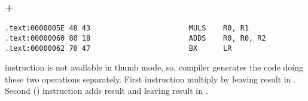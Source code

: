 \subsubsection{\OptimizingKeil + \ThumbMode}

\begin{lstlisting}
.text:0000005E 48 43                       MULS    R0, R1
.text:00000060 80 18                       ADDS    R0, R0, R2
.text:00000062 70 47                       BX      LR
\end{lstlisting}

{ instruction is not available in thumb mode, so, compiler generates the code doing these two operations
separately.}
{First  instruction multiply \Rzero by \Rone leaving result in \Rone.}
{Second () instruction adds result and \Rtwo leaving result in \Rzero.}

